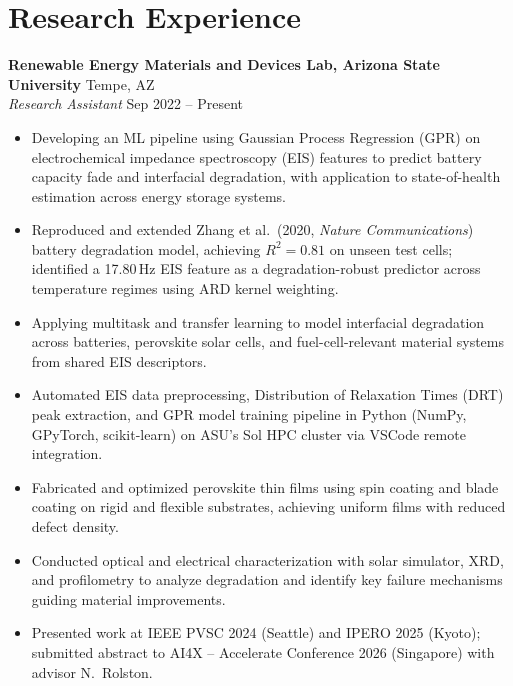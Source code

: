 \documentclass[10pt, letterpaper]{article}
\newcommand{\role}[2]{%
  \textit{#1} \hfill #2 \\[-2pt]%
}
\begin{document}
\section*{Research Experience}

\textbf{Renewable Energy Materials and Devices Lab, Arizona State University} \hfill Tempe, AZ \\
\role{Research Assistant}{Sep 2022 -- Present}
\begin{itemize}
  \item Developing an ML pipeline using Gaussian Process Regression (GPR) on electrochemical
    impedance spectroscopy (EIS) features to predict battery capacity fade and interfacial
    degradation, with application to state-of-health estimation across energy storage systems.
  \item Reproduced and extended Zhang et al.\ (2020, \textit{Nature Communications}) battery
    degradation model, achieving $R^2 = 0.81$ on unseen test cells; identified a 17.80\,Hz EIS
    feature as a degradation-robust predictor across temperature regimes using ARD kernel
    weighting.
  \item Applying multitask and transfer learning to model interfacial degradation across batteries,
    perovskite solar cells, and fuel-cell-relevant material systems from shared EIS descriptors.
  \item Automated EIS data preprocessing, Distribution of Relaxation Times (DRT) peak extraction,
    and GPR model training pipeline in Python (NumPy, GPyTorch, scikit-learn) on ASU's Sol HPC
    cluster via VSCode remote integration.
  \item Fabricated and optimized perovskite thin films using spin coating and blade coating on
    rigid and flexible substrates, achieving uniform films with reduced defect density.
  \item Conducted optical and electrical characterization with solar simulator, XRD, and
    profilometry to analyze degradation and identify key failure mechanisms guiding material
    improvements.
  \item Presented work at IEEE PVSC 2024 (Seattle) and IPERO 2025 (Kyoto); submitted abstract to
    AI4X -- Accelerate Conference 2026 (Singapore) with advisor N.\ Rolston.
\end{itemize}

\vspace{6pt}
\end{document}
